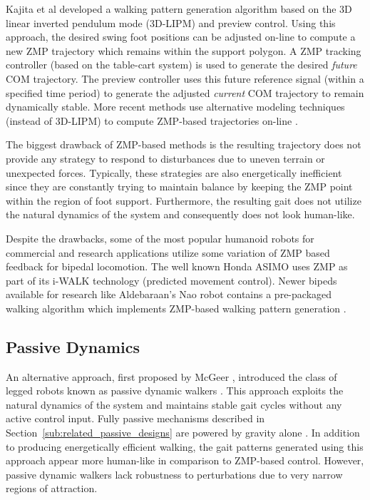 Kajita et al developed a walking pattern generation algorithm \cite{KajitaEtAlICRA2003} based on the 3D linear inverted pendulum mode (3D-LIPM) \cite{Kajita:2001fk} and preview control. Using this approach, the desired swing foot positions can be adjusted on-line to compute a new ZMP trajectory which remains within the support polygon. A ZMP tracking controller (based on the table-cart system) is used to generate the desired \emph{future} COM trajectory. The preview controller uses this future reference signal (within a specified time period) to generate the adjusted \emph{current} COM trajectory to remain dynamically stable. More recent methods use alternative modeling techniques (instead of 3D-LIPM) to compute ZMP-based trajectories on-line \cite{TakenakaEtAlIROS2009}.   

The biggest drawback of ZMP-based methods is the resulting trajectory does not provide any strategy to respond to disturbances due to uneven terrain or unexpected forces. Typically, these strategies are also energetically inefficient since they are constantly trying to maintain balance by keeping the ZMP point within the region of foot support. Furthermore, the resulting gait does not utilize the natural dynamics of the system and consequently does not look human-like.

Despite the drawbacks, some of the most popular humanoid robots for commercial and research applications utilize some variation of ZMP based feedback for bipedal locomotion. The well known Honda ASIMO \cite{Sakagami:2002cf} uses ZMP as part of its i-WALK technology (predicted movement control). Newer bipeds available for research like Aldebaraan's Nao \cite{Gouaillier2006} robot contains a pre-packaged walking algorithm which implements ZMP-based walking pattern generation \cite{Kajita:2006dx}. 


\subsection{Passive Dynamics} %
\label{sub:related_passive_dynamics}
An alternative approach, first proposed by McGeer \cite{McGeer:1990uk}, introduced the class of legged robots known as passive dynamic walkers \cite{Collins:2005vp}. This approach exploits the natural dynamics of the system and maintains stable gait cycles without any active control input. Fully passive mechanisms described in Section~\ref{sub:related_passive_designs} are powered by gravity alone \cite{Spong:1999vk}. In addition to producing energetically efficient walking, the gait patterns generated using this approach appear more human-like in comparison to ZMP-based control. However, passive dynamic walkers lack robustness to perturbations due to very narrow regions of attraction.

